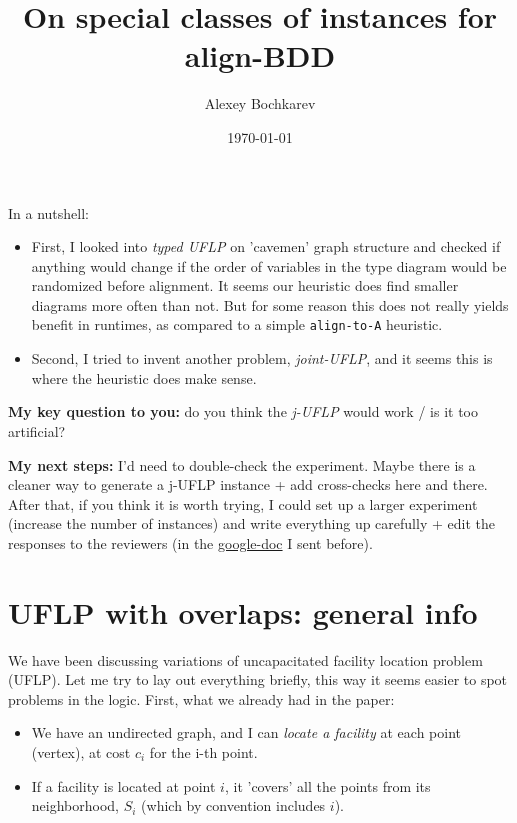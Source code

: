 \documentclass[11pt]{article}
\author{Alexey Bochkarev}
\date{\today}
\title{On special classes of instances for align-BDD}
\begin{document}
\maketitle
In a nutshell:
\begin{itemize}
\item First, I looked into \emph{typed UFLP} on 'cavemen' graph structure and checked if
anything would change if the order of variables in the type diagram would be
randomized before alignment. It seems our heuristic does find smaller diagrams
more often than not. But for some reason this does not really yields benefit
in runtimes, as compared to a simple \texttt{align-to-A} heuristic.
\item Second, I tried to invent another problem, \emph{joint-UFLP}, and it seems this is where the
heuristic does make sense.
\end{itemize}

\textbf{My key question to you:} do you think the \emph{j-UFLP} would work / is it too
artificial?

\textbf{My next steps:} I'd need to double-check the experiment. Maybe there is a
cleaner way to generate a j-UFLP instance + add cross-checks here and there.
After that, if you think it is worth trying, I could set up a larger experiment
(increase the number of instances) and write everything up carefully + edit the
responses to the reviewers (in the \href{https://docs.google.com/document/d/1ArI6yFf6EnCjfm0r3Qogb1VRAa4eLkKdVQ-NB9QtuZQ/edit?usp=sharing}{google-doc} I sent before).


\section{UFLP with overlaps: general info}
\label{sec:org912bfcd}
We have been discussing variations of uncapacitated facility location problem
(UFLP). Let me try to lay out everything briefly, this way it seems easier to
spot problems in the logic. First, what we already had in the paper:
\begin{itemize}
\item We have an undirected graph, and I can \emph{locate a facility} at each point
(vertex), at cost \(c_i\) for the i-th point.
\item If a facility is located at point \(i\), it 'covers' all the points from its
neighborhood, \(S_i\) (which by convention includes \(i\)).
\end{itemize}
\end{document}
